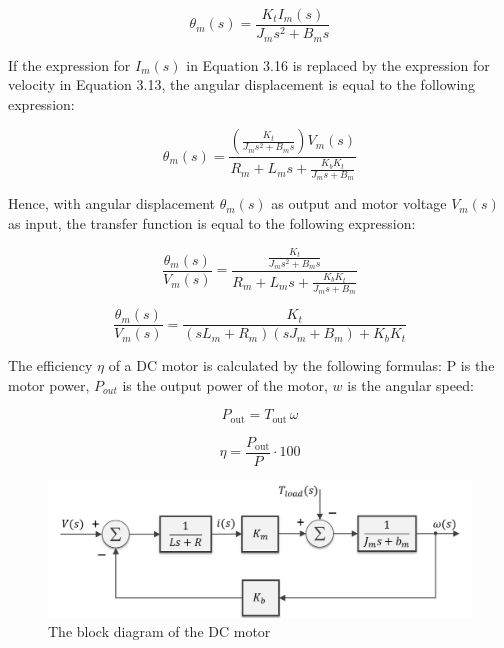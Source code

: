 \begin{equation}
    \theta_m(s) = \frac{K_t I_m(s)}{J_m s^2 + B_m s}
    \label{eq:theta_current_relation}
    \end{equation}

    
    If the expression for \( I_m(s) \) in Equation 3.16 is replaced by the expression for velocity in Equation 3.13, the angular displacement is equal to the following expression: 

\begin{equation}
    \theta_m(s) = 
    \frac{
    \left( \frac{K_t}{J_m s^2 + B_m s} \right) V_m(s)
    }{
    R_m + L_m s + \frac{K_b K_t}{J_m s + B_m}
    }
    \label{eq:theta_over_vm}
    \end{equation}

    Hence, with angular displacement \( \theta_m(s) \) as output and motor voltage \( V_m(s) \) as input, the 
transfer function is equal to the following expression: 

\begin{equation}
    \frac{\theta_m(s)}{V_m(s)} = 
    \frac{
    \frac{K_t}{J_m s^2 + B_m s}
    }{
    R_m + L_m s + \frac{K_b K_t}{J_m s + B_m}
    }
    \label{eq:transfer_unsimplified}
    \end{equation}

    
    \begin{equation}
        \frac{\theta_m(s)}{V_m(s)} = 
        \frac{K_t}{
        (s L_m + R_m)(s J_m + B_m) + K_b K_t
        }
        \label{eq:transfer_simplified}
        \end{equation}

        
    The efficiency \( \eta  \) of a DC motor is calculated by the following formulas: P is the motor power, \( P_{out}  \) is the output power of the motor, \( w \) is the angular speed: 

            \begin{equation}
    P_{\text{out}} = T_{\text{out}} \, \omega
    \label{eq:output_power}
    \end{equation}

    \begin{equation}
        \eta = \frac{P_{\text{out}}}{P} \cdot 100
        \label{eq:efficiency}
        \end{equation}
        

        \begin{figure}[H]
            \centering
            \includegraphics[width=0.8\columnwidth]{imgs/block diagram of the DC motor.png}
            \caption[Short description for list of figures]{The block diagram of the DC motor }
            \label{fig-magnitude}
            \end{figure}%

